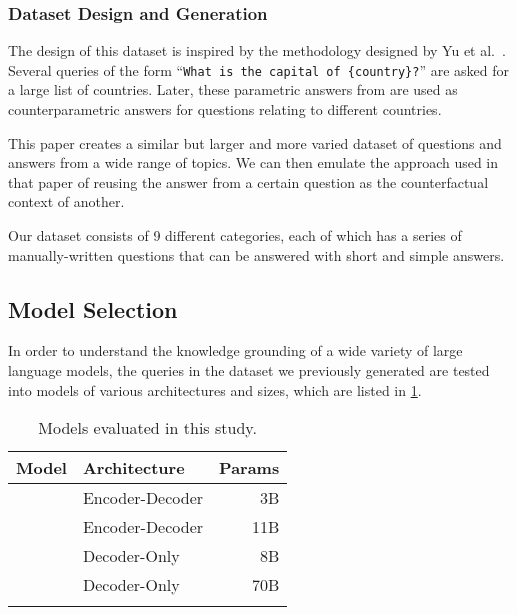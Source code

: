 \subsubsection{Dataset Design and Generation}

The design of this dataset is inspired by the methodology designed by Yu et al.\ \cite{factual_recall}.
Several queries of the form ``\texttt{What is the capital of \{country\}?}'' are asked for a large list of countries.
Later, these parametric answers from are used as counterparametric answers for questions relating to different countries.

This paper creates a similar but larger and more varied dataset of questions and answers from a wide range of topics.
We can then emulate the approach used in that paper of reusing the answer from a certain question as the counterfactual context of another.

Our dataset consists of 9 different categories, each of which has a series of manually-written questions that can be answered with short and simple answers.

\subsection{Model Selection}
\label{model_selection}

In order to understand the knowledge grounding of a wide variety of large language
models, the queries in the dataset we previously generated are tested into models of various architectures and sizes, which are listed in \cref{model_list}.

\begin{table}[htb]
	\centering
	\footnotesize
	\begin{tabular}{l l r}
		\toprule
			Model             & Architecture    & Params \\
		\midrule
			\smallflan{}      & Encoder-Decoder & 3B          \\
			\bigflan{}        & Encoder-Decoder & 11B         \\
			\smallllama{}    & Decoder-Only    & 8B          \\
			\bigllama{} & Decoder-Only    & 70B         \\
		\bottomrule \addlinespace[4pt]
	\end{tabular}
	\caption{Models evaluated in this study.}
	\label{model_list}
\end{table}



